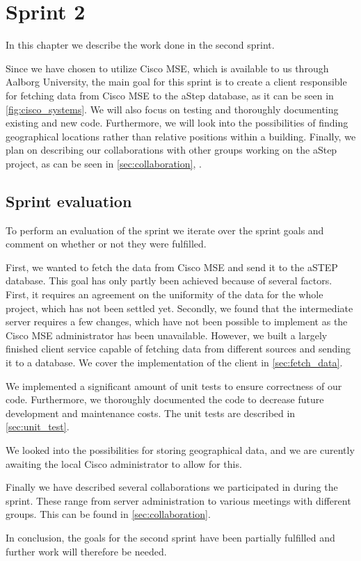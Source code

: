 \chapter{Sprint 2} \label{cha:sprint2}
In this chapter we describe the work done in the second sprint. 

Since we have chosen to utilize Cisco MSE, which is available to us through Aalborg University, the main goal for this sprint is to create a client responsible for fetching data from Cisco MSE to the aStep database, as it can be seen in \cref{fig:cisco_systems}. We will also focus on testing and thoroughly documenting existing and new code. Furthermore, we will look into the possibilities of finding geographical locations rather than relative positions within a building. Finally, we plan on describing our collaborations with other groups working on the aStep project, as can be seen in \cref{sec:collaboration}, .






\section{Sprint evaluation}
To perform an evaluation of the sprint we iterate over the sprint goals and comment on whether or not they were fulfilled.

First, we wanted to fetch the data from Cisco MSE and send it to the aSTEP database. This goal has only partly been achieved because of several factors. First, it requires an agreement on the uniformity of the data for the whole project, which has not been settled yet. Secondly, we found that the intermediate server requires a few changes, which have not been possible to implement as the Cisco MSE administrator has been unavailable. However, we built a largely finished client service capable of fetching data from different sources and sending it to a database. We cover the implementation of the client in \cref{sec:fetch_data}.

We implemented a significant amount of unit tests to ensure correctness of our code. Furthermore, we thoroughly documented the code to decrease future development and maintenance costs. The unit tests are described in \cref{sec:unit_test}.

We looked into the possibilities for storing geographical data, and we are curently awaiting the local Cisco administrator to allow for this.

Finally we have described several collaborations we participated in during the sprint. These range from server administration to various meetings with different groups. This can be found in \cref{sec:collaboration}. 

In conclusion, the goals for the second sprint have been partially fulfilled and further work will therefore be needed.
